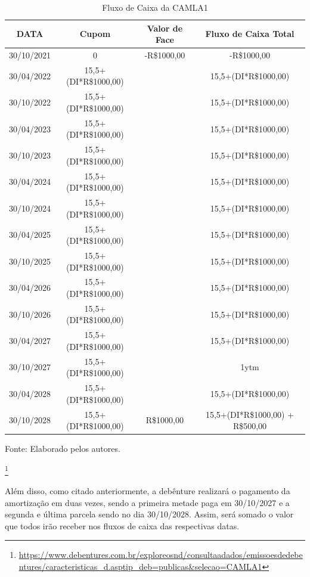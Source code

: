 \documentclass[a4paper,12pt]{article}[abntex2]
\newcommand{\real}[1]{R\$#1}
\begin{document}
\begin{table}[H]
\centering
\caption{Fluxo de Caixa da CAMLA1 }
\begin{tabular}{|c|c|c|c|}
\hline
DATA & Cupom & Valor de Face & Fluxo de Caixa Total \\
\hline
30/10/2021 & 0 & -\real{1000,00} & -\real{1000,00} \\
30/04/2022 & 15,5+(DI*\real{1000,00}) & & 15,5+(DI*\real{1000,00}) \\
30/10/2022 & 15,5+(DI*\real{1000,00}) & & 15,5+(DI*\real{1000,00}) \\
30/04/2023 & 15,5+(DI*\real{1000,00}) & & 15,5+(DI*\real{1000,00}) \\
30/10/2023 & 15,5+(DI*\real{1000,00}) & & 15,5+(DI*\real{1000,00}) \\
30/04/2024 & 15,5+(DI*\real{1000,00}) & & 15,5+(DI*\real{1000,00}) \\
30/10/2024 & 15,5+(DI*\real{1000,00}) & & 15,5+(DI*\real{1000,00}) \\
30/04/2025 & 15,5+(DI*\real{1000,00}) & & 15,5+(DI*\real{1000,00}) \\
30/10/2025 & 15,5+(DI*\real{1000,00}) & & 15,5+(DI*\real{1000,00}) \\
30/04/2026 & 15,5+(DI*\real{1000,00}) & & 15,5+(DI*\real{1000,00}) \\
30/10/2026 & 15,5+(DI*\real{1000,00}) & & 15,5+(DI*\real{1000,00}) \\
30/04/2027 & 15,5+(DI*\real{1000,00}) & & 15,5+(DI*\real{1000,00}) \\
30/10/2027 & 15,5+(DI*\real{1000,00}) & & 1ytm \\
30/04/2028 & 15,5+(DI*\real{1000,00}) & & 15,5+(DI*\real{1000,00}) \\
30/10/2028 & 15,5+(DI*\real{1000,00}) & \real{1000,00} & 15,5+(DI*\real{1000,00}) + \real{500,00} \\
\hline
\end{tabular}
\label{tab:my_label}

\footnotesize{Fonte: Elaborado pelos autores.}
\end{table}
\footnote{\url{https://www.debentures.com.br/exploreosnd/consultaadados/emissoesdedebentures/caracteristicas_d.asptip_deb=publicas&selecao=CAMLA1}}

Além disso, como citado anteriormente, a debênture realizará o pagamento da amortização em duas vezes, sendo a primeira metade paga em 30/10/2027 e a segunda e última parcela sendo no dia 30/10/2028. Assim, será somado o valor que todos irão receber nos fluxos de caixa das respectivas datas. 
\end{document}
